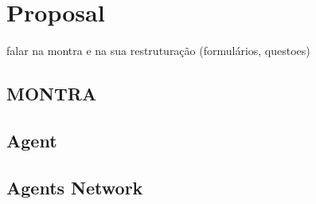 \chapter{Proposal}
\label{chapter:proposal}

falar na montra e na sua restruturação (formulários, questoes)


\section{MONTRA}

\section{Agent}

\section{Agents Network}
